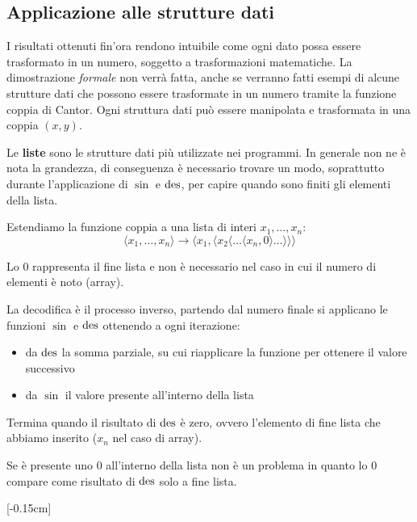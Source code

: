 \subsection{Applicazione alle strutture dati}

I risultati ottenuti fin'ora rendono intuibile come ogni dato possa essere trasformato in un numero, soggetto a trasformazioni matematiche. La dimostrazione \textit{formale} non verrà fatta, anche se verranno fatti esempi di alcune strutture dati che possono essere trasformate in un numero tramite la funzione coppia di Cantor. Ogni struttura dati può essere manipolata e trasformata in una coppia $(x,y)$.

Le \textbf{liste} sono le strutture dati più utilizzate nei programmi. In generale non ne è nota la grandezza, di conseguenza è necessario trovare un modo, soprattutto durante l'applicazione di $\sin$ e $\operatorname{des}$, per capire quando sono finiti gli elementi della lista.

Estendiamo la funzione coppia a una lista di interi $x_1, \dots, x_n$:
$$ \langle x_1, \dots, x_n \rangle \rightarrow \langle x_1, \langle x_2 \langle \dots \langle x_n, 0 \rangle \dots \rangle \rangle \rangle $$

Lo $0$ rappresenta il fine lista e non è necessario nel caso in cui il numero di elementi è noto (array).

La decodifica è il processo inverso, partendo dal numero finale si applicano le funzioni $\sin$ e $\operatorname{des}$ ottenendo a ogni iterazione: 
\begin{itemize}
	\item da $\operatorname{des}$ la somma parziale, su cui riapplicare la funzione per ottenere il valore successivo
	
    \item da $\sin$ il valore presente all'interno della lista
\end{itemize} 

Termina quando il risultato di $\operatorname{des}$ è zero, ovvero l'elemento di fine lista che abbiamo inserito ($x_n$ nel caso di array).
\begin{center}
	
\end{center}

Se è presente uno 0 all'interno della lista non è un problema in quanto lo 0 compare come risultato di $\operatorname{des}$ solo a fine lista.

[-0.15cm]

